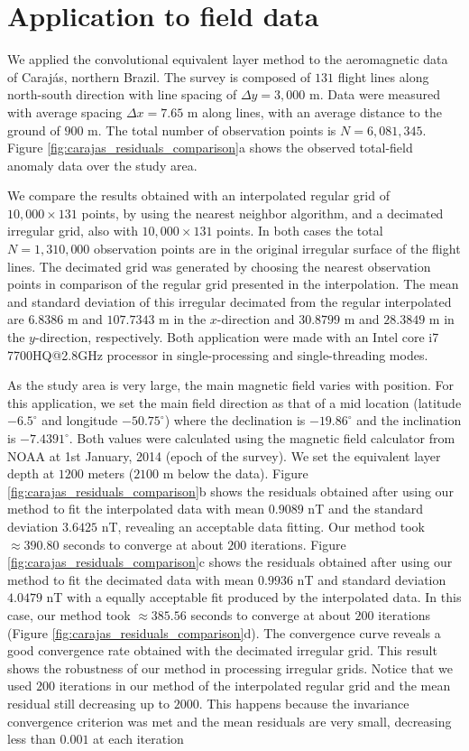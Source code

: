 \documentclass[manuscript,noblind]{geophysics}
\begin{document}
\section{Application to field data}

We applied the convolutional equivalent layer method to the aeromagnetic data of Carajás, 
northern Brazil.
The survey is composed of $131$ flight lines along north-south direction with line spacing of 
$\Delta y = 3,000$ m. 
Data were measured with average spacing $\Delta x = 7.65$ m along lines,
with an average distance to the ground of $900$ m. 
The total number of observation points is $N = 6,081,345$. Figure \ref{fig:carajas_residuals_comparison}a
shows the observed total-field anomaly data over the study area.

We compare the results obtained with an interpolated regular grid of $10,000 \times 131$ points, 
by using the nearest neighbor algorithm, and a decimated irregular grid, also with $10,000 \times 131$
points. In both cases the total $N = 1,310,000$ observation points are in the original irregular surface of the flight lines. 
The decimated grid was generated by 
choosing the nearest observation points in comparison of the regular grid presented in the interpolation.
The mean and standard deviation of this irregular decimated from the regular interpolated are $6.8386$ m and $107.7343$ m in the $x$-direction and $30.8799$ m and $28.3849$ m in the $y$-direction, respectively.
Both application were made with an Intel core i7 7700HQ@2.8GHz processor in single-processing and 
single-threading modes. 

As the study area is very large, the main magnetic field varies with position.
For this application, we set the main field direction as that of a mid location 
(latitude $-6.5^{\circ}$ and longitude $-50.75^{\circ}$) where the declination is $-19.86^{\circ}$ and
the inclination is $-7.4391^{\circ}$. Both values were calculated using the magnetic field calculator from NOAA
at 1st January, 2014 (epoch of the survey). We set the equivalent layer depth at $1200$ meters ($2100$ m below the data).
Figure \ref{fig:carajas_residuals_comparison}b shows the residuals obtained after using our method to fit
the interpolated data with mean $0.9089$ nT and the standard deviation  $3.6425$ nT, revealing an acceptable data fitting. Our method took $\approx 390.80$ seconds to converge at about $200$ iterations.
Figure \ref{fig:carajas_residuals_comparison}c shows the residuals obtained after using our method to fit
the decimated data with mean $0.9936$ nT and standard deviation 
$4.0479$ nT with a equally acceptable fit produced by the interpolated data. In this case, our method took $\approx 385.56$ seconds to converge at about $200$ iterations (Figure \ref{fig:carajas_residuals_comparison}d). 
The convergence curve reveals a good convergence rate obtained with the decimated 
irregular grid. This result shows the robustness of our method in processing irregular grids. Notice that we used $200$ iterations in our method of the interpolated regular grid and the mean residual still decreasing up to $2000$. This happens because the invariance convergence criterion was met and the mean residuals are very small, decreasing less than $0.001$ at each iteration
\end{document}
